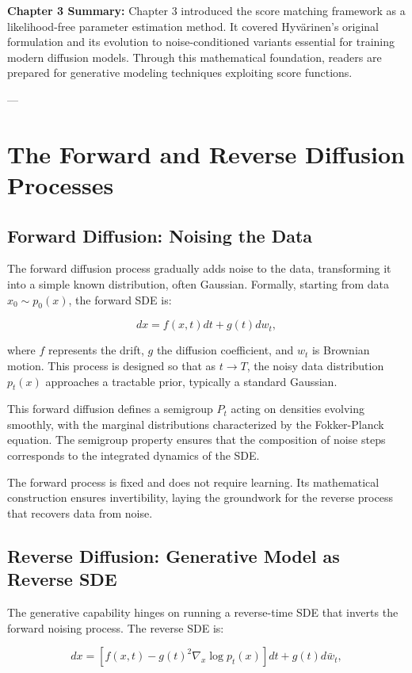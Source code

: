 \textbf{Chapter 3 Summary:}  
Chapter 3 introduced the score matching framework as a likelihood-free parameter estimation method. It covered Hyvärinen’s original formulation and its evolution to noise-conditioned variants essential for training modern diffusion models. Through this mathematical foundation, readers are prepared for generative modeling techniques exploiting score functions.

---

\chapter{The Forward and Reverse Diffusion Processes}

\section{Forward Diffusion: Noising the Data}

The forward diffusion process gradually adds noise to the data, transforming it into a simple known distribution, often Gaussian. Formally, starting from data \( x_0 \sim p_0(x) \), the forward SDE is:

\[
dx = f(x,t) dt + g(t) dw_t,
\]

where \( f \) represents the drift, \( g \) the diffusion coefficient, and \( w_t \) is Brownian motion. This process is designed so that as \( t \to T \), the noisy data distribution \( p_t(x) \) approaches a tractable prior, typically a standard Gaussian.

This forward diffusion defines a semigroup \( P_t \) acting on densities evolving smoothly, with the marginal distributions characterized by the Fokker-Planck equation. The semigroup property ensures that the composition of noise steps corresponds to the integrated dynamics of the SDE.

The forward process is fixed and does not require learning. Its mathematical construction ensures invertibility, laying the groundwork for the reverse process that recovers data from noise.

\section{Reverse Diffusion: Generative Model as Reverse SDE}

The generative capability hinges on running a reverse-time SDE that inverts the forward noising process. The reverse SDE is:

\[
dx = \left[f(x,t) - g(t)^2 \nabla_x \log p_t(x) \right] dt + g(t) d\bar{w}_t,
\]

